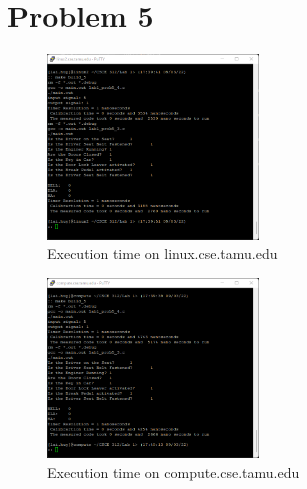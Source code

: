 \clearpage
\section*{Problem 5}
\begin{figure}[h!]
    \centering
    \includegraphics[width=0.5\textwidth]{Images/5 Linux.png}
    \caption{Execution time on linux.cse.tamu.edu}
\end{figure}

\begin{figure}[h!]
    \centering
    \includegraphics[width=0.5\textwidth]{Images/5 Compute.png}
    \caption{Execution time on compute.cse.tamu.edu}
\end{figure}
